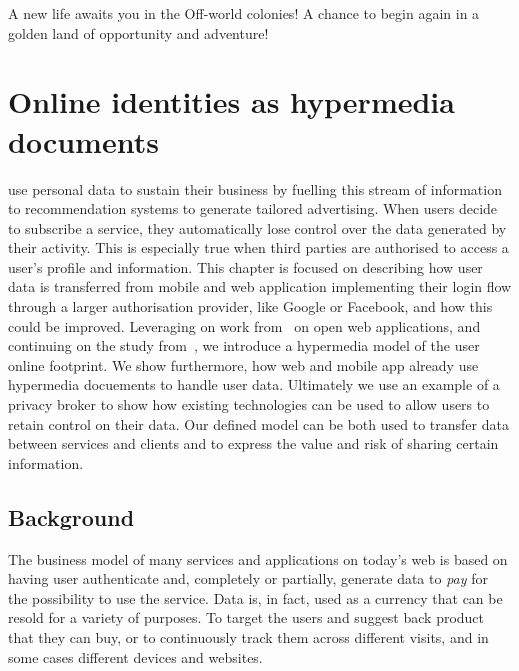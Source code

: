 \begin{savequote}[75mm]
A new life awaits you in the Off-world colonies! A chance to begin again in a golden land of opportunity and adventure!
\end{savequote}

\chapter{Online identities as hypermedia documents}

 use personal data to sustain their business by fuelling this stream of information to recommendation systems to generate tailored advertising. When users decide to subscribe a service, they automatically lose control over the data generated by their activity. This is especially true when third parties are authorised to access a user's profile and information. 
This chapter is focused on describing how user data is transferred from mobile and web application implementing their login flow through a larger authorisation provider, like Google or Facebook, and how this could be improved. Leveraging on work from~\cite{puglisi2015restful} on open web applications, and continuing on the study from~\cite{puglisi2015potential}, we introduce a hypermedia model of the user online footprint. We show furthermore, how web and mobile app already use hypermedia docuements to handle user data. Ultimately we use an example of a privacy broker to show how existing technologies can be used to allow users to retain control on their data. Our defined model can be both used to transfer data between services and clients and to express the value and risk of sharing certain information.

\section{Background}

The business model of many services and applications on today's web is based on having user authenticate and, completely or partially, generate data to \emph{pay} for the possibility to use the service. Data is, in fact, used as a currency that can be resold for a variety of purposes. To target the users and suggest back product that they can buy, or to continuously track them across different visits, and in some cases different devices and websites.

